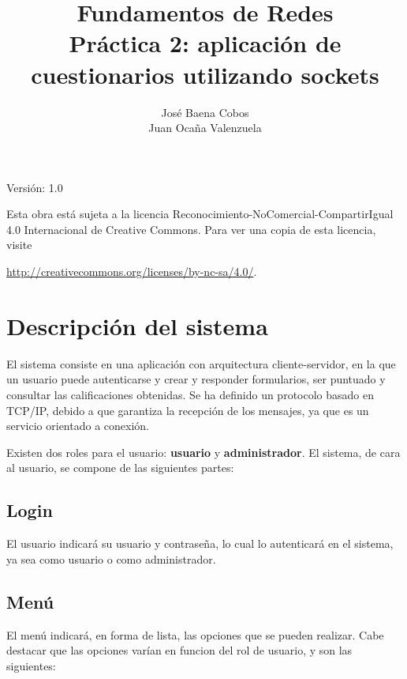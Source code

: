 \documentclass[11pt,a4paper]{article}
\author{	José Baena Cobos \\ Juan Ocaña Valenzuela}
\title{\textbf{Fundamentos de Redes} \\ 
 Práctica 2: aplicación de cuestionarios utilizando sockets}
\begin{document}
\thispagestyle{empty}

\maketitle

\begin{center}

Versión: 1.0
\end{center}

\newpage

Esta obra está sujeta a la licencia Reconocimiento-NoComercial-CompartirIgual 4.0 Internacional de Creative Commons. Para ver una copia de esta licencia, visite 

\url{http://creativecommons.org/licenses/by-nc-sa/4.0/}.

\newpage

\tableofcontents

\newpage

\section{Descripción del sistema}
El sistema consiste en una aplicación con arquitectura cliente-servidor, en la que un usuario puede autenticarse y crear y responder formularios, ser puntuado y consultar las calificaciones obtenidas. 
Se ha definido un protocolo basado en TCP/IP, debido a que garantiza la recepción de los mensajes, ya que es un servicio orientado a conexión.

\medskip

Existen dos roles para el usuario: \textbf{usuario} y \textbf{administrador}.
El sistema, de cara al usuario, se compone de las siguientes partes:

\subsection*{Login}
El usuario indicará su usuario y contraseña, lo cual lo autenticará en el sistema, ya sea como usuario o como administrador.

\subsection*{Menú}
El menú indicará, en forma de lista, las opciones que se pueden realizar. Cabe destacar que las opciones varían en funcion del rol de usuario, y son las siguientes:

\medskip
\end{document}
